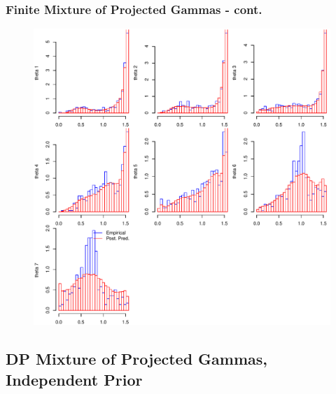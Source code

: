 \documentclass[aspectratio=169]{beamer}
\begin{document}
\begin{frame}
  \frametitle{Finite Mixture of Projected Gammas - cont.}
  \begin{figure}[h!]
    \centering
    \includegraphics[scale = 0.43]{./images/mpg_15_emp_v_pred_decluster}
  \end{figure}
\end{frame}

\subsection{DP Mixture of Projected Gammas, Independent Prior}
\end{document}
